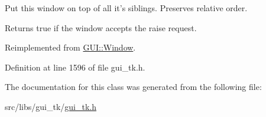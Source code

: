 Put this window on top of all it's siblings. Preserves relative order. 

Returns true if the window accepts the raise request. 

Reimplemented from \hyperlink{classGUI_1_1Window_a90890951f6ce5f043657756b2691e754}{G\-U\-I\-::\-Window}.



Definition at line 1596 of file gui\-\_\-tk.\-h.



The documentation for this class was generated from the following file\-:\begin{DoxyCompactItemize}
\item 
src/libs/gui\-\_\-tk/\hyperlink{gui__tk_8h}{gui\-\_\-tk.\-h}\end{DoxyCompactItemize}

